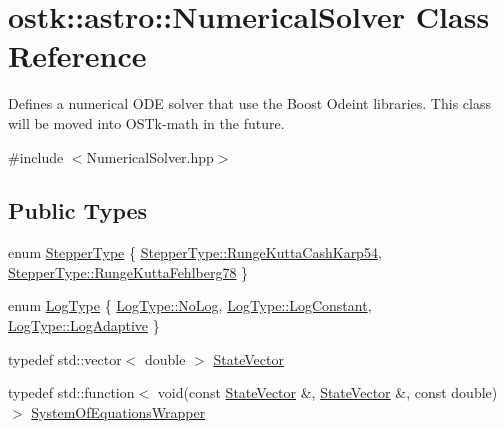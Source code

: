 \hypertarget{classostk_1_1astro_1_1_numerical_solver}{}\section{ostk\+:\+:astro\+:\+:Numerical\+Solver Class Reference}
\label{classostk_1_1astro_1_1_numerical_solver}


Defines a numerical O\+DE solver that use the Boost Odeint libraries. This class will be moved into O\+S\+Tk-\/math in the future.  




{\ttfamily \#include $<$Numerical\+Solver.\+hpp$>$}

\subsection*{Public Types}
\begin{DoxyCompactItemize}
\item 
enum \hyperlink{classostk_1_1astro_1_1_numerical_solver_afb80f81b2c3cc1d356b0b4749e45b947}{Stepper\+Type} \{ \hyperlink{classostk_1_1astro_1_1_numerical_solver_afb80f81b2c3cc1d356b0b4749e45b947a646d9d3aaac989d6fd4990f308ba3a37}{Stepper\+Type\+::\+Runge\+Kutta\+Cash\+Karp54}, 
\hyperlink{classostk_1_1astro_1_1_numerical_solver_afb80f81b2c3cc1d356b0b4749e45b947a5002097811f3eb2dd4a34b826b1288e7}{Stepper\+Type\+::\+Runge\+Kutta\+Fehlberg78}
 \}
\item 
enum \hyperlink{classostk_1_1astro_1_1_numerical_solver_a23e9e3f7d630f3097b4cbd91d9a2aa4c}{Log\+Type} \{ \hyperlink{classostk_1_1astro_1_1_numerical_solver_a23e9e3f7d630f3097b4cbd91d9a2aa4cac224e58a49e83bb9b94e2bd594fd5231}{Log\+Type\+::\+No\+Log}, 
\hyperlink{classostk_1_1astro_1_1_numerical_solver_a23e9e3f7d630f3097b4cbd91d9a2aa4ca40b79e6f53444b0a01aa353abfd9fe91}{Log\+Type\+::\+Log\+Constant}, 
\hyperlink{classostk_1_1astro_1_1_numerical_solver_a23e9e3f7d630f3097b4cbd91d9a2aa4caa412149ee02d5aaab7f9f710b2e39c5e}{Log\+Type\+::\+Log\+Adaptive}
 \}
\item 
typedef std\+::vector$<$ double $>$ \hyperlink{classostk_1_1astro_1_1_numerical_solver_a4a1673a6f74a72d6bacfe6480b9c1ccd}{State\+Vector}
\item 
typedef std\+::function$<$ void(const \hyperlink{classostk_1_1astro_1_1_numerical_solver_a4a1673a6f74a72d6bacfe6480b9c1ccd}{State\+Vector} \&, \hyperlink{classostk_1_1astro_1_1_numerical_solver_a4a1673a6f74a72d6bacfe6480b9c1ccd}{State\+Vector} \&, const double)$>$ \hyperlink{classostk_1_1astro_1_1_numerical_solver_aa39593aa5ff747e4f68492708b45bbc5}{System\+Of\+Equations\+Wrapper}
\end{DoxyCompactItemize}
